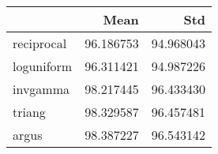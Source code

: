 \begin{tabular}{lrr}
\toprule
{} &       Mean &        Std \\
\midrule
reciprocal &  96.186753 &  94.968043 \\
loguniform &  96.311421 &  94.987226 \\
invgamma   &  98.217445 &  96.433430 \\
triang     &  98.329587 &  96.457481 \\
argus      &  98.387227 &  96.543142 \\
\bottomrule
\end{tabular}
